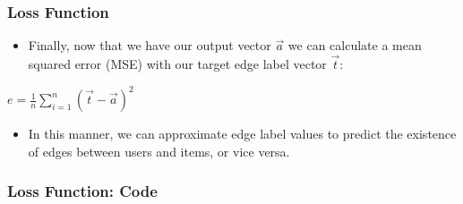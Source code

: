 \documentclass{beamer}
\begin{document}
\begin{frame}[fragile]
\frametitle{Loss Function}
\begin{itemize}

\item Finally, now that we have our output vector $\overrightarrow{a}$ we can calculate a mean squared error (MSE) with our target edge label vector $\overrightarrow{t}$:

\end{itemize}

\vspace{0.5cm}

\begin{center}
    $e = \frac{1}{n} \sum_{i=1}^{n} (\overrightarrow{t} - \overrightarrow{a})^2$
\end{center}

\vspace{0.5cm}

\begin{itemize}

\item In this manner, we can approximate edge label values to predict the existence of edges between users and items, or vice versa.

\end{itemize}
\end{frame}


\begin{frame}[fragile]
\frametitle{Loss Function: Code}



\end{frame}


\begin{frame}
\frametitle{}

\begin{minipage}[c]{0.8\textwidth}
    \hspace{1cm}
    
\end{minipage}

\end{frame}
\end{document}
